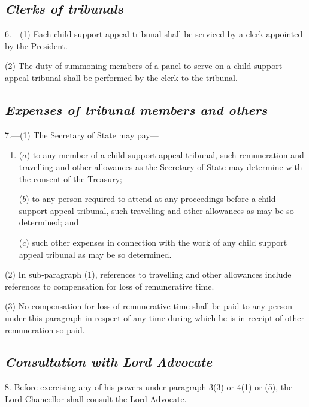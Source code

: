 \documentclass[12pt,a4paper]{article}
\begin{document}
\subsection*{\itshape Clerks of tribunals}

6.---(1) Each child support appeal tribunal shall be serviced by a clerk appointed by the President.

(2) The duty of summoning members of a panel to serve on a child support appeal tribunal shall be performed by the clerk to the tribunal.

\subsection*{\itshape Expenses of tribunal members and others}

7.---(1) The Secretary of State may pay—
\begin{enumerate}\item[]
($a$) to any member of a child support appeal tribunal, such remuneration and travelling and other allowances as the Secretary of State may determine with the consent of the Treasury;

($b$) to any person required to attend at any proceedings before a child support appeal tribunal, such travelling and other allowances as may be so determined; and

($c$) such other expenses in connection with the work of any child support appeal tribunal as may be so determined.
\end{enumerate}

(2) In sub-paragraph (1), references to travelling and other allowances include references to compensation for loss of remunerative time.

(3) No compensation for loss of remunerative time shall be paid to any person under this paragraph in respect of any time during which he is in receipt of other remuneration so paid.

\subsection*{\itshape Consultation with Lord Advocate}

8. Before exercising any of his powers under paragraph 3(3)  or 4(1)
or (5), the Lord Chancellor shall consult the Lord Advocate.

\end{document}

